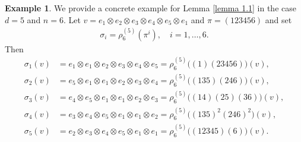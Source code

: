 \documentclass[12pt,dvipsnames,accepted=2016-08-18,a4paper,onecolumn]{quantumarticle}
\numberwithin{equation}{section}
\theoremstyle{definition}
\newtheorem{example}[theorem]{Example}
\begin{document}
\begin{example}
	We provide a concrete example for Lemma \ref{lemma 1.1} in the case $d = 5$ and $n=6.$ Let $v = e_1 \otimes e_2 \otimes e_3 \otimes e_4 \otimes e_5 \otimes e_1$ and $\pi = (1 2 3 4 5 6)$ and set
	\begin{align*}
		\sigma_i = \rho^{(5)}_ 6(\pi^i),  \quad i = 1, \ldots, 6.
	\end{align*}
	Then 
	\begin{align*}
		\sigma_1 (v) &= e_1 \otimes e_1 \otimes e_2 \otimes e_3 \otimes e_4 \otimes e_5 =
		\rho^{(5)}_6 \big( (1)(23456) \big) (v),\\
		\sigma_2 (v) &= e_5 \otimes e_1 \otimes e_1 \otimes e_2 \otimes e_3 \otimes e_4 =
		\rho^{(5)}_6 \big( (135)(246) \big) (v),  \\
		\sigma_3 (v) &= e_4 \otimes e_5 \otimes e_1 \otimes e_1 \otimes e_2 \otimes e_3 =
		\rho^{(5)}_6 \big( (14)(25)(36) \big) (v),  \\
		\sigma_4 (v) &= e_3 \otimes e_4 \otimes e_5 \otimes e_1 \otimes e_1 \otimes e_2 =
		\rho^{(5)}_6 \big( (135)^2(246)^2 \big) (v),  \\
		\sigma_5 (v) &= e_2 \otimes e_3 \otimes e_4 \otimes e_5 \otimes e_1 \otimes e_1 =
		\rho^{(5)}_6 \big( (12345)(6) \big) (v).  
	\end{align*}
\end{example}
\end{document}
